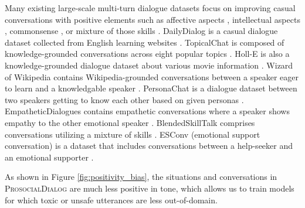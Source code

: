 \documentclass[11pt]{article}
\newcommand{\datasetName}{\textsc{ProsocialDialog}\xspace}
\newcommand{\eg}{e.g.,\xspace}
\begin{document}
Many existing large-scale multi-turn dialogue datasets focus on improving casual conversations with positive elements such as affective aspects \cite[\eg emotion, persona, empathy;][]{li2017daily, zhang2018persona, rashkin2019empathy, liu2021esc}, intellectual aspects \cite[\eg Wikipedia knowledge][]{dinan2018wizard, moghe2018towards, gopalakrishnan2019topical, komeili2021internet}, commonsense \cite{zhou2021probing}, or mixture of those skills \cite{smith2020bst}.
DailyDialog is a casual dialogue dataset collected from English learning websites \cite{li2017daily}.
TopicalChat is composed of knowledge-grounded conversations across eight popular topics \cite[\eg Fashion, Books, Sports, Music;][]{gopalakrishnan2019topical}.
Holl-E is also a knowledge-grounded dialogue dataset about various movie information \cite[\eg plots, comments, reviews;][]{moghe2018towards}.
Wizard of Wikipedia contains Wikipedia-grounded conversations between a speaker eager to learn and a knowledgable speaker \cite{dinan2018wizard}.
PersonaChat is a dialogue dataset between two speakers getting to know each other based on given personas \cite{zhang2018persona}.
EmpatheticDialogues contains empathetic conversations where a speaker shows empathy to the other emotional speaker \cite{rashkin2019empathy}.
BlendedSkillTalk comprises conversations utilizing a mixture of skills \cite[\eg persona, empathy, knowledge;][]{smith2020bst}.
ESConv (emotional support conversation) is a dataset that includes conversations between a help-seeker and an emotional supporter \cite{liu2021esc}.

As shown in Figure \ref{fig:positivity_bias}, the situations and conversations in \datasetName are much less positive in tone, which allows us to train models for which toxic or unsafe utterances are less out-of-domain.
 
\end{document}
